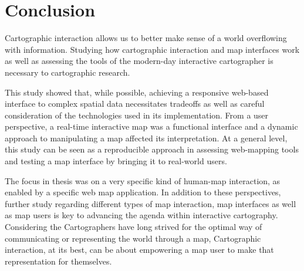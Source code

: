 \section{Conclusion}

Cartographic interaction allows us to better make sense of a world overflowing with information.
Studying how cartographic interaction and map interfaces work
as well as assessing the tools of the modern-day interactive cartographer
is necessary to cartographic research.

This study showed that, while possible, achieving a responsive web-based interface to complex spatial data
necessitates tradeoffs as well as careful consideration of the technologies used in its implementation.
From a user perspective, a real-time interactive map was a functional interface
and a dynamic approach to manipulating a map affected its interpretation.
At a general level,
this study can be seen as a reproducible approach in assessing web-mapping tools
and testing a map interface by bringing it to real-world users.

The focus in thesis was on a very specific kind of human-map interaction,
as enabled by a specific web map application.
In addition to these perspectives,
further study regarding different types of map interaction, map interfaces as well as map users is key
to advancing the agenda within interactive cartography.
Considering the 
Cartographers have long strived for the optimal way of
communicating or representing the world through a map,
Cartographic interaction, at its best,
can be about empowering a map user to make that representation for themselves.





